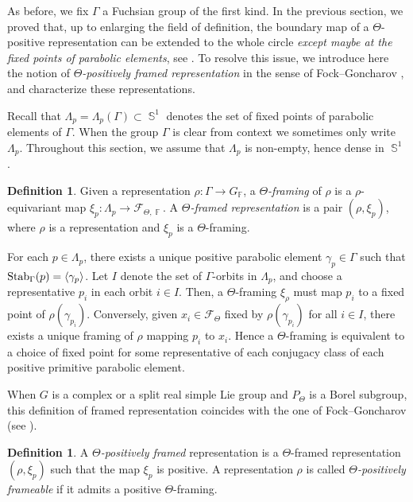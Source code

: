\documentclass{amsart}
\theoremstyle{plain}
\theoremstyle{definition}
\newtheorem{definition}[proposition]{Definition}
\DeclareMathOperator{\Fb}{{\mathbb{F}}}
\DeclareMathOperator{\Sb}{\mathbb{S}}
\newcommand{\Stab}{\textnormal{Stab}}
\newcommand{\1}{\mathbf{1}}
\begin{document}
As before, we fix $\Gamma$ a Fuchsian group of the first kind. In the previous section, we proved that, up to enlarging the field of definition, the boundary map of a $\Theta$-positive representation can be extended to the whole circle \emph{except maybe at the fixed points of parabolic elements}, see .
To resolve this issue, we introduce here the notion of \emph{$\Theta$-positively framed representation} in the sense of Fock--Goncharov \cite{fock2006moduli}, and characterize these representations.

Recall that $\Lambda_p = \Lambda_p(\Gamma) \subset \Sb^1$ denotes the set of fixed points of parabolic elements of $\Gamma$.
When the group $\Gamma$ is clear from context we sometimes only write $\Lambda_p$.
Throughout this section, we assume that $\Lambda_p$ is non-empty, hence dense in $\Sb^1$.

\begin{definition}
\label{def : framed representation}
    Given a representation $\rho \colon \Gamma \to G_{\Fb}$, a \emph{$\Theta$-framing} of $\rho$ is a $\rho$-equivariant map $\xi_p \colon \Lambda_p \to \mathcal F_{\Theta,\Fb}$.
    A \emph{$\Theta$-framed representation} is a pair $(\rho, \xi_p)$, where $\rho$ is a representation and $\xi_p$ is a $\Theta$-framing.
\end{definition}

For each $p\in \Lambda_p$, there exists a unique positive parabolic element $\gamma_p\in \Gamma$ such that $\Stab_\Gamma(p) = \langle \gamma_p\rangle$. Let $I$ denote the set of $\Gamma$-orbits in $\Lambda_p$, and choose a representative $p_i$ in each orbit $i\in I$. Then, a $\Theta$-framing $\xi_\rho$ must map $p_i$ to a fixed point of $\rho(\gamma_{p_i})$. Conversely, given $x_i\in \mathcal F_\Theta$ fixed by $\rho(\gamma_{p_i})$ for all $i \in I$, there exists a unique framing of $\rho$ mapping $p_i$ to $x_i$. Hence a $\Theta$-framing is equivalent to a choice of fixed point for some representative of each conjugacy class of each positive primitive parabolic element.

When $G$ is a complex or a split real simple Lie group and $P_\Theta$ is a Borel subgroup, this definition of framed representation coincides with the one of Fock--Goncharov (see \cite[Lemma 1.1]{fock2006moduli}).

 \begin{definition}
    A \emph{$\Theta$-positively framed} representation is a $\Theta$-framed representation $(\rho, \xi_p)$ such that the map $\xi_p$ is positive.
    A representation $\rho$ is called \emph{$\Theta$-positively frameable} if it admits a positive $\Theta$-framing.
\end{definition}
\end{document}
